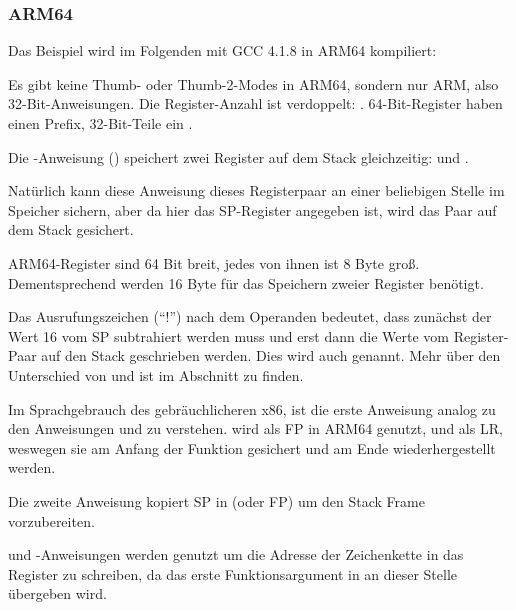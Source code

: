 \subsubsection{ARM64}


Das Beispiel wird im Folgenden mit GCC 4.1.8 in ARM64 kompiliert:



Es gibt keine Thumb- oder Thumb-2-Modes in ARM64, sondern nur ARM, also 32-Bit-Anweisungen.
Die Register-Anzahl ist verdoppelt: .
64-Bit-Register haben einen Prefix, 32-Bit-Teile ein .

Die -Anweisung () speichert zwei Register auf dem Stack gleichzeitig:
 und .

Natürlich kann diese Anweisung dieses Registerpaar an einer beliebigen Stelle im Speicher
sichern, aber da hier das \ac{SP}-Register angegeben ist, wird das Paar auf dem Stack gesichert.

ARM64-Register sind 64 Bit breit, jedes von ihnen ist 8 Byte groß. Dementsprechend werden 16 Byte
für das Speichern zweier Register benötigt.

Das Ausrufungszeichen (``!'')  nach dem Operanden bedeutet, dass zunächst der Wert 16 vom \ac{SP}
subtrahiert werden muss und erst dann die Werte vom Register-Paar auf den Stack geschrieben werden.
Dies wird auch  genannt.
Mehr über den Unterschied von  und  ist im Abschnitt
 zu finden.

Im Sprachgebrauch des gebräuchlicheren x86, ist die erste Anweisung analog zu den Anweisungen
 und  zu verstehen.
 wird als \ac{FP} in ARM64 genutzt, und  als \ac{LR}, weswegen sie am Anfang der
Funktion gesichert und am Ende wiederhergestellt werden.

Die zweite Anweisung kopiert \ac{SP} in  (oder \ac{FP}) um den Stack Frame vorzubereiten.

\label{pointers_ADRP_and_ADD}
 und \ADD-Anweisungen werden genutzt um die Adresse der Zeichenkette  in das
Register  zu schreiben, da das erste Funktionsargument in an dieser Stelle übergeben wird. 

